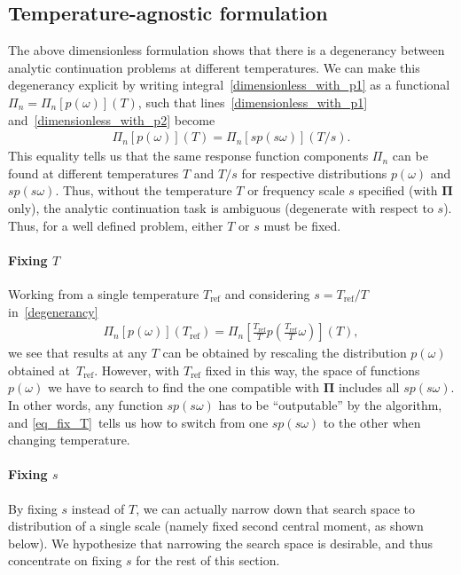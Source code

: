 \documentclass[notitlepage,11pt,nofootinbib]{revtex4-1}
\renewcommand{\vec}[1]{\bm{#1}}
\begin{document}
\subsection{Temperature-agnostic formulation}
\label{section_temperature_agnostic}
The above dimensionless formulation shows that there is a degenerancy between analytic continuation problems at different temperatures. We can make this degenerancy explicit by writing integral~\eqref{dimensionless_with_p1} as a functional $\Pi_n = \Pi_n[p(\omega)](T)$, such that lines~\eqref{dimensionless_with_p1} and~\eqref{dimensionless_with_p2} become 
\begin{align}
\Pi_n[p(\omega)](T) = \Pi_n[sp(s\omega)](T/s).
\label{degenerancy}
\end{align}
This equality tells us that the same response function components $\Pi_n$ can be found at different temperatures $T$ and $T/s$ for respective distributions $p(\omega)$ and $sp(s\omega)$. Thus, without the temperature $T$ or frequency scale $s$ specified (with $\vec \Pi$ only), the analytic continuation task is ambiguous (degenerate with respect to $s$). Thus, for a well defined problem, either $T$ or $s$ must be fixed.

\paragraph*{Fixing $T$}
Working from a single temperature $T_\text{{ref}}$ and considering $s=T_\text{{ref}}/T$ in~\eqref{degenerancy}
\begin{align}
    \Pi_n[p(\omega)](T_\text{{ref}}) = \Pi_n[\tfrac{T_{\text{ref}}}{T} p(\tfrac{T_{\text{ref}}}{T}\omega)](T),
    \label{eq_fix_T}
\end{align}
we see that results at any $T$ can be obtained by rescaling the distribution $p(\omega)$ obtained at~$T_\text{{ref}}$. 
However, with $T_\text{{ref}}$ fixed in this way, the space of functions $p(\omega)$ we have to search to find the one compatible with $\vec \Pi$ includes all $sp(s\omega)$. In other words, any function $sp(s\omega)$ has to be ``outputable'' by the algorithm, and \eqref{eq_fix_T}~tells us how to switch from one $sp(s\omega)$ to the other when changing temperature.

\paragraph*{Fixing $s$}
By fixing $s$ instead of $T$, we can actually narrow down that search space to distribution of a single scale (namely fixed second central moment, as shown below). We hypothesize that narrowing the search space is desirable, and thus concentrate on fixing $s$ for the rest of this section.
\end{document}
